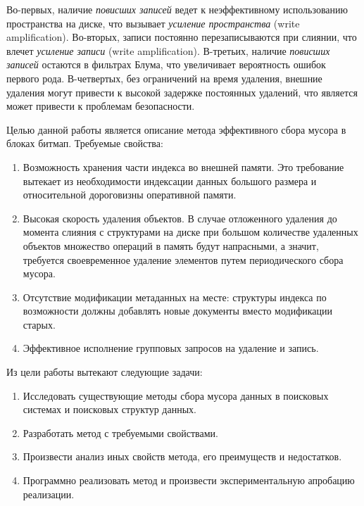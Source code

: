 Во-первых, наличие \textit{повисших записей} ведет к неэффективному использованию
пространства на диске, что вызывает \textit{усиление пространства}
(write amplification). Во-вторых, записи постоянно перезаписываются при слиянии,
что влечет \textit{усиление записи} (write amplification). В-третьих, наличие
\textit{повисших записей} остаются в фильтрах Блума, что увеличивает вероятность
ошибок первого рода. В-четвертых, без ограничений на время удаления, внешние удаления могут привести к высокой задержке постоянных удалений, что является может привести
к проблемам безопасности. \cite{Lethe:2020}

Целью данной работы является описание метода эффективного сбора  мусора в блоках
битмап. Требуемые свойства:
\begin{enumerate}
    \item Возможность хранения части индекса во внешней памяти. Это требование вытекает
    из необходимости индексации данных большого размера и относительной дороговизны
    оперативной памяти.
    \item Высокая скорость удаления объектов. В случае отложенного удаления до момента
    слияния с структурами на диске при большом количестве удаленных объектов множество
    операций в память будут напрасными, а значит, требуется своевременное удаление
    элементов путем периодического сбора мусора.
    \item Отсутствие модификации метаданных на месте: структуры индекса по возможности должны добавлять новые документы вместо модификации старых.
    \item Эффективное исполнение групповых запросов на удаление и запись. 
\end{enumerate}

Из цели работы вытекают следующие задачи:
\begin{enumerate}
    \item Исследовать существующие методы сбора мусора данных в поисковых системах
    и поисковых структур данных.
    \item Разработать метод с требуемыми свойствами.
    \item Произвести анализ иных свойств метода, его преимуществ и недостатков.
    \item Программно реализовать метод и произвести экспериментальную апробацию реализации. 
\end{enumerate}